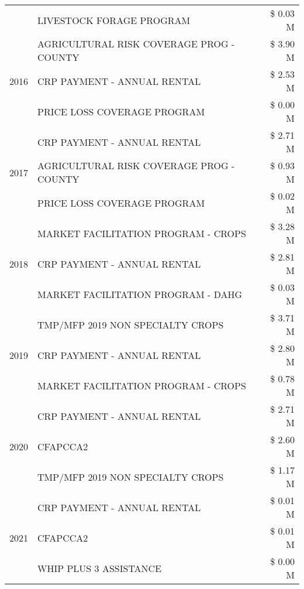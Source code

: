 \begin{tabular}{llr}
 & LIVESTOCK FORAGE PROGRAM & \$ 0.03 M \\
\cline{1-3}
\multirow[t]{3}{*}{2016} & AGRICULTURAL RISK COVERAGE PROG - COUNTY      & \$ 3.90 M \\
 & CRP PAYMENT - ANNUAL RENTAL                   & \$ 2.53 M \\
 & PRICE LOSS COVERAGE PROGRAM                   & \$ 0.00 M \\
\cline{1-3}
\multirow[t]{3}{*}{2017} & CRP PAYMENT - ANNUAL RENTAL & \$ 2.71 M \\
 & AGRICULTURAL RISK COVERAGE PROG - COUNTY & \$ 0.93 M \\
 & PRICE LOSS COVERAGE PROGRAM & \$ 0.02 M \\
\cline{1-3}
\multirow[t]{3}{*}{2018} & MARKET FACILITATION PROGRAM - CROPS & \$ 3.28 M \\
 & CRP PAYMENT - ANNUAL RENTAL & \$ 2.81 M \\
 & MARKET FACILITATION PROGRAM - DAHG & \$ 0.03 M \\
\cline{1-3}
\multirow[t]{3}{*}{2019} & TMP/MFP 2019 NON SPECIALTY CROPS & \$ 3.71 M \\
 & CRP PAYMENT - ANNUAL RENTAL & \$ 2.80 M \\
 & MARKET FACILITATION PROGRAM - CROPS & \$ 0.78 M \\
\cline{1-3}
\multirow[t]{3}{*}{2020} & CRP PAYMENT - ANNUAL RENTAL & \$ 2.71 M \\
 & CFAPCCA2 & \$ 2.60 M \\
 & TMP/MFP 2019 NON SPECIALTY CROPS & \$ 1.17 M \\
\cline{1-3}
\multirow[t]{3}{*}{2021} & CRP PAYMENT - ANNUAL RENTAL & \$ 0.01 M \\
 & CFAPCCA2 & \$ 0.01 M \\
 & WHIP PLUS 3 ASSISTANCE & \$ 0.00 M \\
\cline{1-3}
\bottomrule
\end{tabular}
